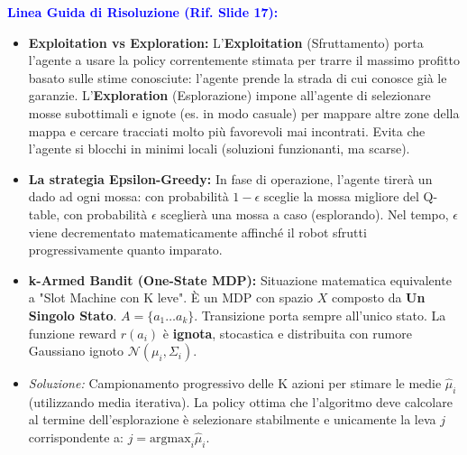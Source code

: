 \documentclass[11pt,a4paper]{article}
\begin{document}
\textbf{\textcolor{blue}{Linea Guida di Risoluzione (Rif. Slide 17):}}
\begin{itemize}
    \item \textbf{Exploitation vs Exploration:} L'\textbf{Exploitation} (Sfruttamento) porta l'agente a usare la policy correntemente stimata per trarre il massimo profitto basato sulle stime conosciute: l'agente prende la strada di cui conosce già le garanzie. L'\textbf{Exploration} (Esplorazione) impone all'agente di selezionare mosse subottimali e ignote (es. in modo casuale) per mappare altre zone della mappa e cercare tracciati molto più favorevoli mai incontrati. Evita che l'agente si blocchi in minimi locali (soluzioni funzionanti, ma scarse).
    \item \textbf{La strategia Epsilon-Greedy:} In fase di operazione, l'agente tirerà un dado ad ogni mossa: con probabilità $1-\epsilon$ sceglie la mossa migliore del Q-table, con probabilità $\epsilon$ sceglierà una mossa a caso (esplorando). Nel tempo, $\epsilon$ viene decrementato matematicamente affinché il robot sfrutti progressivamente quanto imparato.
    \item \textbf{k-Armed Bandit (One-State MDP):} Situazione matematica equivalente a "Slot Machine con K leve". È un MDP con spazio $X$ composto da \textbf{Un Singolo Stato}. $A = \{a_1 \dots a_k\}$. Transizione porta sempre all'unico stato. La funzione reward $r(a_i)$ è \textbf{ignota}, stocastica e distribuita con rumore Gaussiano ignoto $\mathcal{N}(\mu_i, \Sigma_i)$.
    \item \textit{Soluzione:} Campionamento progressivo delle K azioni per stimare le medie $\hat{\mu}_i$ (utilizzando media iterativa). La policy ottima che l'algoritmo deve calcolare al termine dell'esplorazione è selezionare stabilmente e unicamente la leva $j$ corrispondente a: $j = \text{argmax}_i \hat{\mu}_i$.
\end{itemize}
\end{document}

